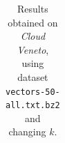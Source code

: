 \documentclass[10pt]{article}
\begin{document}
\begin{table}[H]
\begin{tabularx}{\textwidth}{c || p{1.5cm} | p{1.5cm} | c | c | p{1.7cm} | p{2.2cm} | p{1.5cm} | p{2cm} }
  \end{tabularx}
  \caption{Results obtained on \textit{Cloud Veneto}, using dataset \texttt{vectors-50-all.txt.bz2} and changing $k$.} \label{tab:results1}
\end{table}
\end{document}
